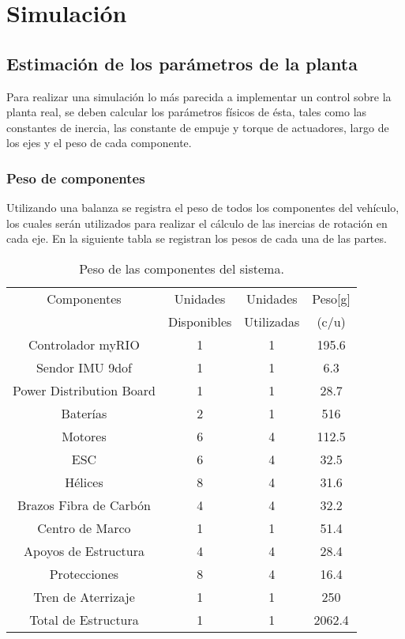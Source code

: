 \documentclass[\main/main.tex]{subfiles}
\begin{document}
\section{Simulación}\label{Simulacion}

\subsection{\noindent Estimación de los parámetros de la planta}

Para realizar una simulación lo más parecida a implementar un control
sobre la planta real, se deben calcular los parámetros físicos de
ésta, tales como las constantes de inercia, las constante de empuje
y torque de actuadores, largo de los ejes y el peso de cada componente. 


\subsubsection{Peso de componentes}

Utilizando una balanza se registra el peso de todos los componentes
del vehículo, los cuales serán utilizados para realizar el cálculo
de las inercias de rotación en cada eje. En la siguiente tabla se
registran los pesos de cada una de las partes.



\begin{table}[H]
\begin{centering}
\begin{tabular}{|c|c|c|c|}
\hline 
Componentes  & Unidades & Unidades  & Peso{[}g{]}\tabularnewline
 & Disponibles & Utilizadas & (c/u)\tabularnewline
\hline 
\hline 
Controlador myRIO & 1 & 1 & 195.6\tabularnewline
\hline 
Sendor IMU 9dof & 1 & 1 & 6.3\tabularnewline
\hline 
Power Distribution Board & 1 & 1 & 28.7\tabularnewline
\hline 
Baterías  & 2 & 1 & 516\tabularnewline
\hline 
Motores & 6 & 4 & 112.5\tabularnewline
\hline 
ESC & 6 & 4 & 32.5\tabularnewline
\hline 
Hélices  & 8 & 4 & 31.6\tabularnewline
\hline 
Brazos Fibra de Carbón & 4 & 4 & 32.2\tabularnewline
\hline 
Centro de Marco & 1 & 1 & 51.4\tabularnewline
\hline 
Apoyos de Estructura & 4 & 4 & 28.4\tabularnewline
\hline 
Protecciones & 8 & 4 & 16.4\tabularnewline
\hline 
Tren de Aterrizaje & 1 & 1 & 250\tabularnewline
\hline 
Total de Estructura & 1 & 1 & 2062.4\tabularnewline
\hline  
\end{tabular}
\par\end{centering}
\caption{Peso de las componentes del sistema.}
\end{table}
\end{document}
